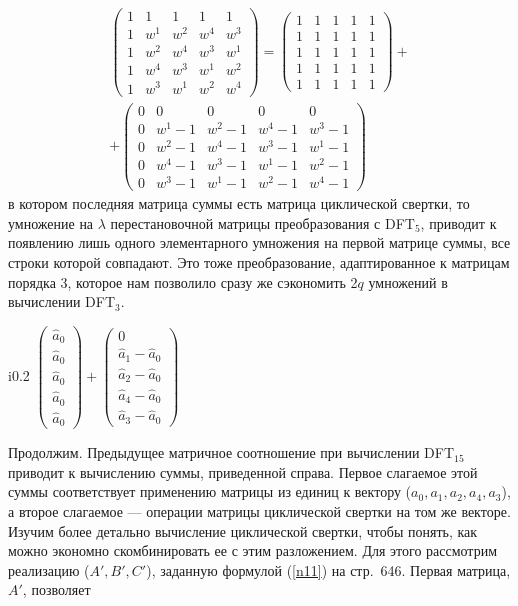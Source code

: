 \documentclass{mai_book}
\begin{document}
\begin{multline*}
  \begin{pmatrix} 1 & 1 & 1 & 1 & 1 \\ 1 & w^1 & w^2 & w^4 & w^3 \\ 1 & w^2 & w^4 & w^3 & w^1 \\ 1 & w^4 & w^3 & w^1 & w^2 \\ 1 & w^3 & w^1 & w^2 & w^4 \end{pmatrix} = \begin{pmatrix} 1 & 1 & 1 & 1 & 1 \\ 1 & 1 & 1 & 1 & 1 \\ 1 & 1 & 1 & 1 & 1 \\ 1 & 1 & 1 & 1 & 1 \\ 1 & 1 & 1 & 1 & 1 \end{pmatrix} + \\
  + \begin{pmatrix} 0 & 0 & 0 & 0 & 0 \\ 0 & w^1-1 & w^2-1 & w^4-1 & w^3-1 \\ 0 & w^2-1 & w^4-1 & w^3-1 & w^1-1 \\ 0 & w^4-1 & w^3-1 & w^1-1 & w^2-1 \\ 0 & w^3-1 & w^1-1 & w^2-1 & w^4-1 \end{pmatrix}
  \end{multline*}\noindent
в котором последняя матрица суммы есть матрица циклической свертки, то умножение на $\lambda$ перестановочной матрицы преобразования с D{\footnotesize FT}$_5$, приводит к появлению лишь одного элементарного умножения на первой матрице суммы, все строки которой совпадают. Это тоже преобразование, адаптированное к матрицам порядка 3, которое нам позволило сразу же сэкономить 2$q$ умножений в вычислении D{\footnotesize FT}$_3$.\par 
\begin{wrapfigure}{i}{0.2\textwidth}
$\begin{pmatrix} \hat{a}_0 \\ \hat{a}_0 \\ \hat{a}_0 \\ \hat{a}_0 \\ \hat{a}_0 \end{pmatrix} + \begin{pmatrix} 0 \\ \hat{a}_1 - \hat{a}_0 \\ \hat{a}_2 - \hat{a}_0 \\ \hat{a}_4 - \hat{a}_0 \\ \hat{a}_3 - \hat{a}_0 \end{pmatrix}$
\end{wrapfigure}
Продолжим. Предыдущее матричное соотношение при вычислении D{\footnotesize FT}$_{15}$ приводит к вычислению суммы, приведенной справа. Первое слагаемое этой суммы соответствует применению матрицы из единиц к вектору ($a_0,a_1,a_2,a_4,a_3$), а второе слагаемое --- операции матрицы циклической свертки на том же векторе. Изучим более детально вычисление циклической свертки, чтобы понять, как можно экономно скомбинировать ее с этим разложением. Для этого рассмотрим реализацию ($A',B',C'$), заданную формулой (\ref{n11}) на стр.~646. Первая матрица, $A'$, позволяет
\end{document}

